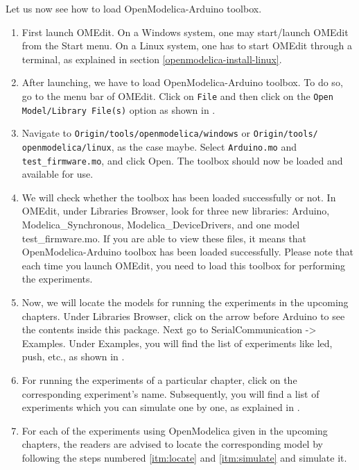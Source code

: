 Let us now see how to load OpenModelica-Arduino toolbox. 
\begin{enumerate}
      \item First launch OMEdit. On a Windows system, one may start/launch
            OMEdit from the Start menu. On a Linux system, one has to
            start OMEdit through a terminal, as
            explained in section \ref{openmodelica-install-linux}.
      \item After launching, we have to load OpenModelica-Arduino
            toolbox. To do so, go to the menu bar of OMEdit. 
            Click on {\tt File} and then click on
            the {\tt Open Model/Library File(s)} option as shown in .
      \item Navigate to {\tt Origin/tools/openmodelica/windows} or {\tt Origin/tools/\\openmodelica/linux}, as the case maybe.
            Select {\tt Arduino.mo} and \\{\tt test\_firmware.mo}, and click Open. The toolbox should now be loaded and available for use. 
      \item \label{itm:library} We will check whether the toolbox has been loaded successfully or not. 
            In OMEdit, under Libraries Browser, look for three new libraries: Arduino,
            Modelica\_Synchronous, Modelica\_DeviceDrivers, and one model test\_firmware.mo. 
            If you are able to view these files, it means that OpenModelica-Arduino toolbox has been loaded successfully. 
            Please note that each time you launch OMEdit, you need to load this toolbox for
            performing the experiments. 
      \item \label{itm:locate} Now, we will locate the models for running the experiments in the upcoming chapters. 
            Under Libraries Browser, click on the arrow before Arduino to see the 
            contents inside this package. Next go to SerialCommunication -> Examples. 
            Under Examples, you will find the list of experiments like led, push, etc., 
            as shown in .
      \item \label{itm:simulate} For running the experiments of a particular chapter, click on the corresponding 
            experiment's name. Subsequently, you will find a list of experiments which you can 
            simulate one by one, as explained in .
      \item For each of the experiments using OpenModelica given in the upcoming chapters, the readers 
            are advised to locate the corresponding model by following the steps
            numbered \ref{itm:locate} and \ref{itm:simulate} and simulate it.  
\end{enumerate}



